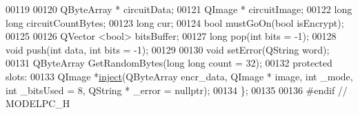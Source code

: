 \begin{DoxyCode}
00119 
00120     QByteArray * circuitData;
00121     QImage * circuitImage;
00122     \textcolor{keywordtype}{long} \textcolor{keywordtype}{long} circuitCountBytes;
00123     \textcolor{keywordtype}{long} cur;
00124     \textcolor{keywordtype}{bool} mustGoOn(\textcolor{keywordtype}{bool} isEncrypt);
00125 
00126     QVector <bool> bitsBuffer;
00127     \textcolor{keywordtype}{long} pop(\textcolor{keywordtype}{int} bits = -1);
00128     \textcolor{keywordtype}{void} push(\textcolor{keywordtype}{int} data, \textcolor{keywordtype}{int} bits = -1);
00129 
00130     \textcolor{keywordtype}{void} setError(QString word);
00131     QByteArray GetRandomBytes(\textcolor{keywordtype}{long} \textcolor{keywordtype}{long} count = 32);
00132 \textcolor{keyword}{protected} slots:
00133     QImage *\hyperlink{class_model_p_c_aada6a04d81ada8f2b4ba18108c8d6f10}{inject}(QByteArray encr\_data, QImage * image, \textcolor{keywordtype}{int} \_mode, \textcolor{keywordtype}{int} \_bitsUsed = 8, QString *
      \_error = \textcolor{keyword}{nullptr});
00134 \};
00135 
00136 \textcolor{preprocessor}{#endif // MODELPC\_H}
\end{DoxyCode}
